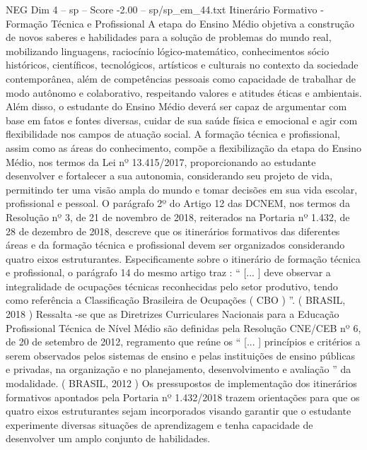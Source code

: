 \begin{textsample}{NEG Dim 4 – sp – Score -2.00 – sp/sp\_em\_44.txt}  \label{ex:f4_neg_035}
Itinerário Formativo - Formação Técnica e Profissional A etapa do Ensino Médio objetiva a construção de novos saberes e habilidades para a solução de problemas do mundo real, mobilizando linguagens, raciocínio lógico-matemático, conhecimentos sócio históricos, científicos, tecnológicos, artísticos e culturais no contexto da sociedade contemporânea, além de competências pessoais como capacidade de trabalhar de modo autônomo e colaborativo, respeitando valores e atitudes éticas e ambientais.
Além disso, o estudante do Ensino Médio deverá ser capaz de argumentar com base em fatos e fontes diversas, cuidar de sua saúde física e emocional e agir com flexibilidade nos campos de atuação social.
A formação técnica e profissional, assim como as áreas do conhecimento, compõe a flexibilização da etapa do Ensino Médio, nos termos da Lei nº 13.415/2017, proporcionando ao estudante desenvolver e fortalecer a sua autonomia, considerando seu projeto de vida, permitindo ter uma visão ampla do mundo e tomar decisões em sua vida escolar, profissional e pessoal.
O parágrafo 2º do Artigo 12 das DCNEM, nos termos da Resolução nº 3, de 21 de novembro de 2018, reiterados na Portaria nº 1.432, de 28 de dezembro de 2018, descreve que os itinerários formativos das diferentes áreas e da formação técnica e profissional devem ser organizados considerando quatro eixos estruturantes.
Especificamente sobre o itinerário de formação técnica e profissional, o parágrafo 14 do mesmo artigo traz : “ [... ] deve observar a integralidade de ocupações técnicas reconhecidas pelo setor produtivo, tendo como referência a Classificação Brasileira de Ocupações ( CBO ) ”. ( BRASIL, 2018 ) Ressalta -se que as Diretrizes Curriculares Nacionais para a Educação Profissional Técnica de Nível Médio são definidas pela Resolução CNE/CEB nº 6, de 20 de setembro de 2012, regramento que reúne os “ [... ] princípios e critérios a serem observados pelos sistemas de ensino e pelas instituições de ensino públicas e privadas, na organização e no planejamento, desenvolvimento e avaliação ” da modalidade. ( BRASIL, 2012 ) Os pressupostos de implementação dos itinerários formativos apontados pela Portaria nº 1.432/2018 trazem orientações para que os quatro eixos estruturantes sejam incorporados visando garantir que o estudante experimente diversas situações de aprendizagem e tenha capacidade de desenvolver um amplo conjunto de habilidades.

\end{textsample}
